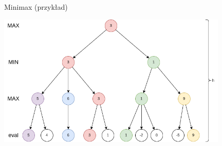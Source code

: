 \begin{frame}{Minimax (przykład)}
	
	{\centering
	\includegraphics[width=11cm]{figures/minimax3.png}
	}

\end{frame}

